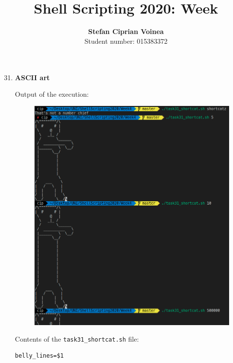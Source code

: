 \documentclass[9pt]{article}
\begin{document}
\title{Shell Scripting 2020: Week }
\author{\textbf{Stefan Ciprian Voinea}\\Student number: 015383372}
\maketitle


\begin{enumerate}
	
	\setcounter{enumi}{30}
	
	\item \textbf{ASCII art}
	
		Output of the execution:
		\begin{figure}[h!]
			\centering
			\includegraphics[width=14cm]{img/31.png}
		\end{figure}
	
		\newpage
		Contents of the \texttt{task31\_shortcat.sh} file:
		\begin{lstlisting}
belly_lines=$1


\end{lstlisting}
\end{enumerate}
\end{document}

